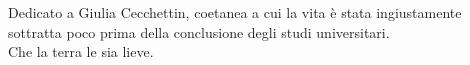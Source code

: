 \cleardoublepage
{}
\thispagestyle{empty}

\vspace*{3cm}

\begin{center}
    Dedicato a Giulia Cecchettin, coetanea a cui la vita è stata ingiustamente sottratta poco prima della conclusione degli studi universitari. \\
    Che la terra le sia lieve.
\end{center}
